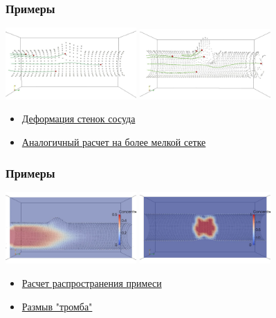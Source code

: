 \documentclass[14pt]{beamer}
\begin{document}
\begin{frame}
\frametitle{Примеры}
    \begin{center}
        \includegraphics[width=5cm]{cylinder1_avi.png}
        \vspace{0.40mm}
        \includegraphics[width=5cm]{cylinder2_avi.png}
    \end{center}

\begin{itemize}
    \item[\MVRightarrow] \href{run:video/cylinder1.avi}{Деформация стенок сосуда}
    \item[\MVRightarrow] \href{run:video/cylinder2.avi}{Аналогичный расчет на более мелкой сетке}
\end{itemize}
\end{frame}

\begin{frame}
\frametitle{Примеры}
    \begin{center}
        \includegraphics[width=5cm]{source_in_vessel_avi.png}
        \vspace{0.40mm}
        \includegraphics[width=5cm]{thrombus_in_vessel_avi.png}
    \end{center}

\begin{itemize}
    \item[\MVRightarrow] \href{run:video/source_in_vessel.avi}{Расчет распространения примеси}
    \item[\MVRightarrow] \href{run:video/thrombus_in_vessel.avi}{Размыв "тромба"}
\end{itemize}
\end{frame}
\end{document}
